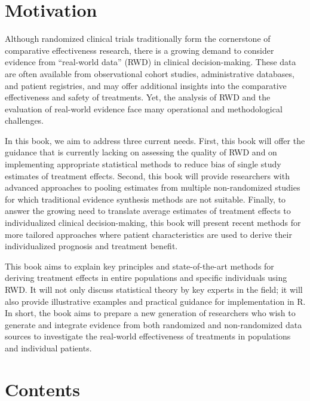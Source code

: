\documentclass[
  letterpaper,
  DIV=11,
  numbers=noendperiod]{scrreprt}
\begin{document}
\hypertarget{motivation}{%
\section*{Motivation}\label{motivation}}


Although randomized clinical trials traditionally form the cornerstone
of comparative effectiveness research, there is a growing demand to
consider evidence from ``real-world data'' (RWD) in clinical
decision-making. These data are often available from observational
cohort studies, administrative databases, and patient registries, and
may offer additional insights into the comparative effectiveness and
safety of treatments. Yet, the analysis of RWD and the evaluation of
real-world evidence face many operational and methodological challenges.

In this book, we aim to address three current needs. First, this book
will offer the guidance that is currently lacking on assessing the
quality of RWD and on implementing appropriate statistical methods to
reduce bias of single study estimates of treatment effects. Second, this
book will provide researchers with advanced approaches to pooling
estimates from multiple non-randomized studies for which traditional
evidence synthesis methods are not suitable. Finally, to answer the
growing need to translate average estimates of treatment effects to
individualized clinical decision-making, this book will present recent
methods for more tailored approaches where patient characteristics are
used to derive their individualized prognosis and treatment benefit.

This book aims to explain key principles and state-of-the-art methods
for deriving treatment effects in entire populations and specific
individuals using RWD. It will not only discuss statistical theory by
key experts in the field; it will also provide illustrative examples and
practical guidance for implementation in R. In short, the book aims to
prepare a new generation of researchers who wish to generate and
integrate evidence from both randomized and non-randomized data sources
to investigate the real-world effectiveness of treatments in populations
and individual patients.

\hypertarget{contents}{%
\section*{Contents}\label{contents}}
\end{document}
